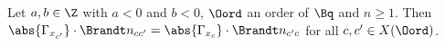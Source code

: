 Let $a,b\in\Z$ with $a<0$ and $b<0$, $\Oord$ an order of $\Bq$ and $n\ge1$. Then
$\abs{\Gamma_{x_{c'}}}\cdot\Brandt n_{cc'}=\abs{\Gamma_{x_c}}\cdot\Brandt n_{c'c}$ for all $c,c'\in X(\Oord)$.
